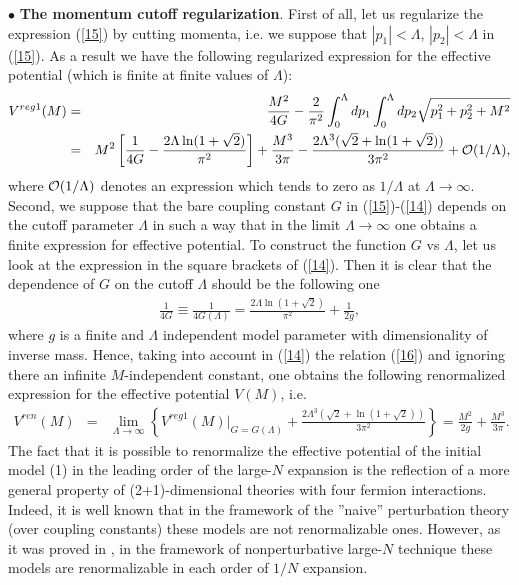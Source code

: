\documentclass[12pt,a4paper]{article}
\begin{document}
$\bullet$
{\bf The momentum cutoff regularization}. First of all, let us regularize the expression (\ref{15}) by cutting
momenta, i.e. we suppose that $|p_1|<\Lambda$, $|p_2|<\Lambda$ in
(\ref{15}). As a result we have the following regularized expression
for the effective potential (which is finite at finite values of
$\Lambda$):
 \begin{eqnarray}
V^{reg1}(M)&=&\frac{M^2}{4G}-\frac{2}{\pi^2}\int_0^\Lambda
dp_1\int_0^\Lambda dp_2\sqrt{p_1^2+p_2^2+M^2} \nonumber\\&=&M^2\left
[\frac 1{4G}-\frac{2\Lambda\ln(1+\sqrt{2})}{\pi^2}\right
]+\frac{M^3}{3\pi}-
\frac{2\Lambda^3(\sqrt{2}+\ln(1+\sqrt{2}))}{3\pi^2}+{\cal
O}(1/\Lambda), \label{14}
\end{eqnarray}
where ${\cal O}(1/\Lambda)$ denotes an expression which tends to
zero as $1/\Lambda$ at $\Lambda\to \infty$.
 Second, we suppose that the bare coupling constant
$G$ in (\ref{15})-(\ref{14}) depends on the cutoff parameter $\Lambda$
in such a way that in the limit
$\Lambda\to\infty$ one obtains a finite expression for effective potential. To construct the
function $G$ vs $\Lambda$, let us look at the expression in the square brackets of (\ref{14}).
Then it is clear that
the dependence of $G$ on the cutoff $\Lambda$ should be the following one
 \begin{eqnarray}
\frac 1{4G}\equiv \frac
1{4G(\Lambda)}=\frac{2\Lambda\ln(1+\sqrt{2})}{\pi^2}+\frac{1}{2g},
\label{16}
\end{eqnarray}
where $g$ is a finite and $\Lambda$ independent model parameter with dimensionality of inverse mass. Hence, taking
into account in (\ref{14}) the relation (\ref{16}) and ignoring there an infinite $M$-independent constant,
one obtains the following renormalized expression for the effective potential $V(M)$, i.e.
\begin{eqnarray}
V^{ren}(M)&=&\lim_{\Lambda\to\infty}\left\{V^{reg1}
(M)\Big |_{G= G(\Lambda)}+\frac{2\Lambda^3(\sqrt{2}+\ln(1+\sqrt{2}))}{3\pi^2}\right\}%
=\frac{M^2}{2g}+\frac{M^3}{3\pi}. \label{17}
\end{eqnarray}
The fact that it is possible to renormalize the effective potential
of the initial model (1) in the leading order of the large-$N$ expansion is the reflection of a more general property of
(2+1)-dimensional theories with four fermion interactions. Indeed,
it is well known that in the framework of  the ''naive''
perturbation theory (over coupling constants) these models are not
renormalizable ones. However, as it was proved in \cite{rosenstein},
in the framework of nonperturbative large-$N$ technique these models
are renormalizable in each order of $1/N$ expansion.
\end{document}
